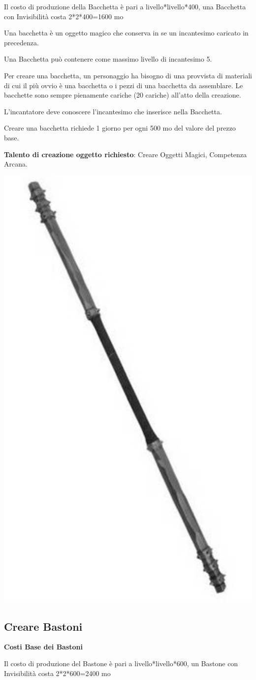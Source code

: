 \begin{multicols}{2}
Il costo di produzione della Bacchetta è pari a livello*livello*400, una Bacchetta con Invisibilità costa 2*2*400=1600 mo

Una bacchetta è un oggetto magico che conserva in se un incantesimo caricato in precedenza.

Una Bacchetta può contenere come massimo livello di incantesimo 5.

Per creare una bacchetta, un personaggio ha bisogno di una provvista di materiali di cui il più ovvio è una bacchetta o i pezzi di una bacchetta da assemblare. Le bacchette sono sempre pienamente cariche (20 cariche) all'atto della creazione.

L'incantatore deve conoscere l'incantesimo che inserisce nella Bacchetta.


Creare una bacchetta richiede 1 giorno per ogni 500 mo del valore del prezzo base.

\medskip

\textbf{Talento di creazione oggetto richiesto}: Creare Oggetti Magici, Competenza Arcana.



\begin{center}
	\includegraphics[width=0.35\linewidth]{immagini/staff2.png}
\end{center}

\subsection{Creare Bastoni}\label{crearebastoni}

\textbf{Costi Base dei Bastoni}

\bigskip

Il costo di produzione del Bastone è pari a livello*livello*600, un Bastone con Invisibilità costa 2*2*600=2400 mo


\end{multicols}
